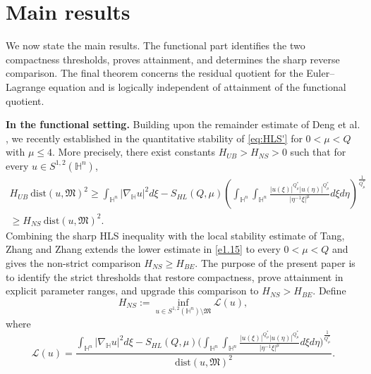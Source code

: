 \documentclass[11pt]{article}
\begin{document}
\section{Main results}\label{sec main}

{We now state the main results. The functional part identifies the two compactness thresholds, proves attainment, and determines the sharp reverse comparison. The final theorem concerns the residual quotient for the Euler--Lagrange equation and is logically independent of attainment of the functional quotient.}

{\bf{In the functional setting.}}
Building upon the remainder estimate of Deng et al. \cite{DTYZ23}, we recently established in \cite[Theorem 1.1]{CW26} the quantitative stability of \eqref{eq:HLS'} for $0<\mu<Q$ with $\mu\leq4$. More precisely, there exist constants $H_{UB}>H_{NS}>0$ such that for every $u\in S^{1,2}(\mathbb{H}^{n})$,
\begin{multline}\label{e1.15}
 H_{UB}~ \mathrm{dist}(u,\mathfrak{M})^2\geq \int_{\mathbb{H}^{n}}|\nabla_{\mathbb{H}} u|^{2}{d}\xi-S_{HL}(Q,\mu) \left(\int_{\mathbb{H}^{n}}\int_{\mathbb{H}^{n}}\frac{|u(\xi)|^{Q^{\ast}_{\mu}}|u(\eta)|
^{Q^{\ast}_{\mu}}}{|\eta^{-1}\xi|^{\mu}}{d}\xi{d}\eta\right)^{\frac{1}{Q^{\ast}_{\mu}}}\\
\geq H_{NS} ~ \mathrm{dist}(u,\mathfrak{M})^2.
\end{multline}
{Combining the sharp HLS inequality with the local stability estimate of Tang, Zhang and Zhang \cite{TZZ24} extends the lower estimate in \eqref{e1.15} to every $0<\mu<Q$ and gives the non-strict comparison $H_{NS}\geq H_{BE}$. The purpose of the present paper is to identify the strict thresholds that restore compactness, prove attainment in explicit parameter ranges, and upgrade this comparison to $H_{NS}>H_{BE}$.}
Define
\begin{equation}\label{defH}
 H_{NS}:=\inf\limits_{u\in S^{1,2}(\mathbb{H}^{n})\setminus \mathfrak{M}}\mathcal{L}(u),
\end{equation}
where
\begin{equation*}
 \mathcal{L}(u)=\frac{\int_{\mathbb{H}^{n}}|\nabla_{\mathbb{H}} u|^{2}{d}\xi-S_{HL}(Q,\mu) \Big(\int_{\mathbb{H}^{n}}\int_{\mathbb{H}^{n}}\frac{|u(\xi)|^{Q^{\ast}_{\mu}}|u(\eta)|
^{Q^{\ast}_{\mu}}}{|\eta^{-1}\xi|^{\mu}}{d}\xi{d}\eta\Big)^{\frac{1}{Q^{\ast}_{\mu}}}}{\mathrm{dist}(u,\mathfrak{M})^2}.
\end{equation*}
\end{document}
